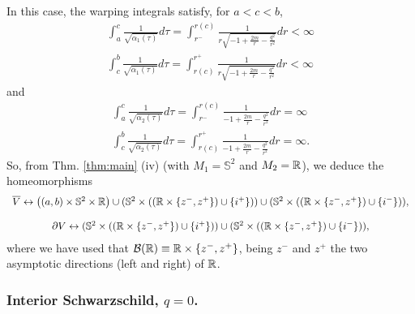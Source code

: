 In this case, the warping integrals satisfy, for $a<c<b$,
 \begin{align}
   \int_{a}^{c}\frac{1}{\sqrt{\alpha_1(\tau)}}d\tau = \int_{r^-}^{r(c)}\frac{1}{r\sqrt{-1+\frac{2m}{r}-\frac{q^2}{r^2}}}dr<\infty\label{eq:38a} \\
   \int_{c}^{b}\frac{1}{\sqrt{\alpha_1(\tau)}}d\tau=\int^{r^+}_{r(c)}\frac{1}{r\sqrt{-1+\frac{2m}{r}-\frac{q^2}{r^2}}}dr<\infty\label{eq:38b}
  \end{align}
and
  \begin{align}
    \int_{a}^{c}\frac{1}{\sqrt{\alpha_2(\tau)}}d\tau=\int_{r^-}^{r(c)}\frac{1}{-1+\frac{2m}{r}-\frac{q^2}{r^2}}dr=\infty \label{eq:38}\\
    \int_{c}^{b}\frac{1}{\sqrt{\alpha_2(\tau)}}d\tau=\int^{r^+}_{r(c)}\frac{1}{-1+\frac{2m}{r}-\frac{q^2}{r^2}}dr=\infty.\label{eq:38c}
  \end{align}
  So, from Thm. \ref{thm:main} (iv) (with $M_1=\mathbb{S}^2$ and $M_2={\mathbb R}$), we deduce the homeomorphisms
  \[
    \begin{array}{c}
      \overline{V}\leftrightarrow \left((a,b)\times \mathbb{S}^2\times {\mathbb R}\right) \cup (\mathbb{S}^2\times \left(\left({\mathbb R}\times \{z^-, z^+\}\right)\cup \{i^+\} \right))\cup (\mathbb{S}^2\times \left(\left({\mathbb R}\times \{z^-, z^+\}\right)\cup \{i^-\}\right)),\\
      \\
\partial V\leftrightarrow (\mathbb{S}^2\times \left(\left({\mathbb R}\times \{z^-, z^+\}\right)\cup \{i^+\} \right))\cup (\mathbb{S}^2\times \left(\left({\mathbb R}\times \{z^-, z^+\}\right)\cup \{i^-\}\right)),
    \end{array}
    \]
    where we have used that ${\cal B}({\mathbb R})\equiv {\mathbb R}\times \{z^-,z^+\}$, being $z^-$ and $z^+$ the two asymptotic directions (left and right) of ${\mathbb R}$.

  \subsubsection*{Interior Schwarzschild, $q=0$.}

